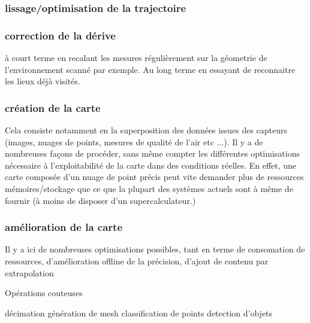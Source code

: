 \documentclass[twoside,twocolumn]{article}
\begin{document}
\subsubsection{lissage/optimisation de la trajectoire}
\subsubsection{correction de la dérive}
à court terme en recalant les mesures régulièrement sur la géometrie de
l'environnement scanné par exemple.
Au long terme en essayant de reconnaitre les lieux déjà visités.
\subsubsection{création de la carte}
Cela consiste notamment en la superposition des données issues des capteurs
(images, nuages de points, mesures de qualité de l'air etc ...).
Il y a de nombreuses façons de procéder, sans même compter les différentes
optimisations nécessaire à l'exploitabilité de la carte dans des conditions
réelles. En effet, une carte composée d'un nuage de point précis peut vite
demander plus de ressources mémoires/stockage que ce que la plupart des
systèmes actuels sont à même de fournir (à moins de disposer d'un supercalculateur.)

\subsubsection{amélioration de la carte}

Il y a ici de nombreuses optimisations possibles, tant en terme de consomation de ressources,
d'amélioration offline de la précision, d'ajout de contenu par extrapolation

Opérations couteuses

décimation
génération de mesh
classification de points
detection d'objets
\end{document}
